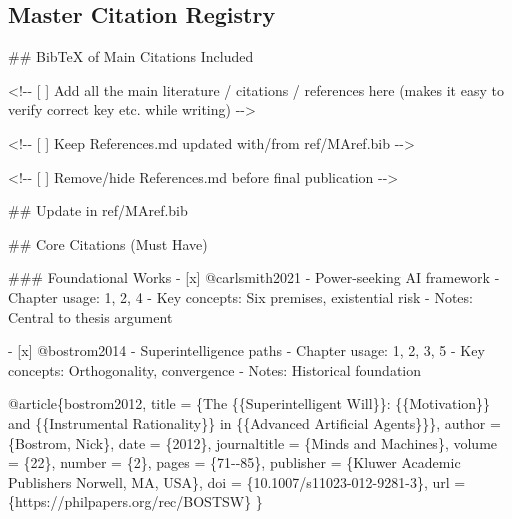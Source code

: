 \documentclass[
  11pt,
  letterpaper,
]{book}
\newenvironment{Shaded}{\begin{snugshade}}{\end{snugshade}}
\newcommand{\CommentTok}[1]{\textcolor[rgb]{0.37,0.37,0.37}{#1}}
\newcommand{\FunctionTok}[1]{\textcolor[rgb]{0.28,0.35,0.67}{#1}}
\newcommand{\NormalTok}[1]{\textcolor[rgb]{0.00,0.23,0.31}{#1}}
\newcommand{\SpecialStringTok}[1]{\textcolor[rgb]{0.13,0.47,0.30}{#1}}
\newcommand{\VariableTok}[1]{\textcolor[rgb]{0.07,0.07,0.07}{#1}}
\begin{document}
\subsection{Master Citation Registry}\label{master-citation-registry}

\begin{Shaded}
\begin{Highlighting}[]

\FunctionTok{\#\# BibTeX of Main Citations Included}

\CommentTok{\textless{}!{-}{-} [ ] Add all the main literature / citations / references here (makes it easy to verify correct key etc. while writing) {-}{-}\textgreater{}}

\CommentTok{\textless{}!{-}{-} [ ] Keep \textquotesingle{}References.md\textquotesingle{} updated with/from ref/MAref.bib {-}{-}\textgreater{}}

\CommentTok{\textless{}!{-}{-} [ ] Remove/hide \textquotesingle{}References.md\textquotesingle{} before final publication {-}{-}\textgreater{}}

\FunctionTok{\#\# Update in ref/MAref.bib}


\FunctionTok{\#\# Core Citations (Must Have)}

\FunctionTok{\#\#\# Foundational Works}
\SpecialStringTok{{-} }\VariableTok{[x]}\NormalTok{ @carlsmith2021 {-} Power{-}seeking AI framework}
\SpecialStringTok{  {-} }\NormalTok{Chapter usage: 1, 2, 4}
\SpecialStringTok{  {-} }\NormalTok{Key concepts: Six premises, existential risk}
\SpecialStringTok{  {-} }\NormalTok{Notes: Central to thesis argument}

\SpecialStringTok{{-} }\VariableTok{[x]}\NormalTok{ @bostrom2014 {-} Superintelligence paths}
\SpecialStringTok{  {-} }\NormalTok{Chapter usage: 1, 2, 3, 5}
\SpecialStringTok{  {-} }\NormalTok{Key concepts: Orthogonality, convergence}
\SpecialStringTok{  {-} }\NormalTok{Notes: Historical foundation}



\NormalTok{@article\{bostrom2012,}
\NormalTok{  title = \{The \{\{Superintelligent Will\}\}: \{\{Motivation\}\} and \{\{Instrumental Rationality\}\} in \{\{Advanced Artificial Agents\}\}\},}
\NormalTok{  author = \{Bostrom, Nick\},}
\NormalTok{  date = \{2012\},}
\NormalTok{  journaltitle = \{Minds and Machines\},}
\NormalTok{  volume = \{22\},}
\NormalTok{  number = \{2\},}
\NormalTok{  pages = \{71{-}{-}85\},}
\NormalTok{  publisher = \{Kluwer Academic Publishers Norwell, MA, USA\},}
\NormalTok{  doi = \{10.1007/s11023{-}012{-}9281{-}3\},}
\NormalTok{  url = \{https://philpapers.org/rec/BOSTSW\}}
\NormalTok{\}}


\end{Highlighting}
\end{Shaded}
\end{document}
